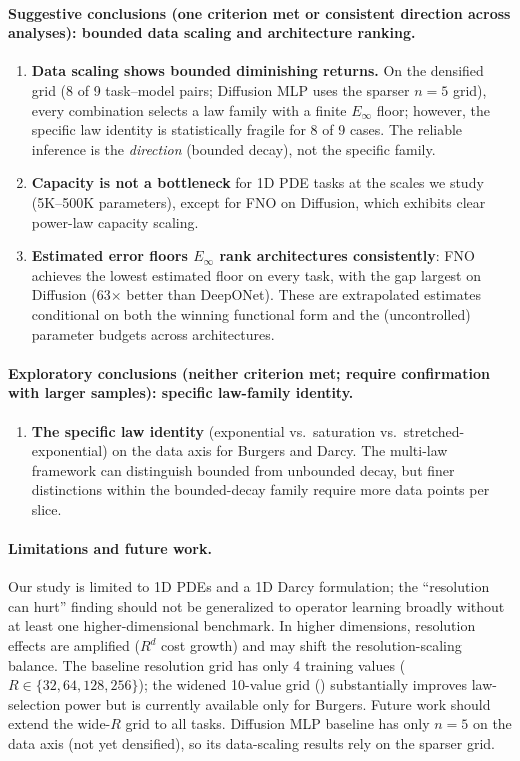 \documentclass[11pt]{article}
\newcommand{\Einf}{E_\infty}
\begin{document}
\paragraph{Suggestive conclusions (one criterion met or consistent
direction across analyses): bounded data scaling and architecture
ranking.}
\begin{enumerate}[resume]
  \item \textbf{Data scaling shows bounded diminishing returns.}
    On the densified grid (8 of 9 task--model pairs; Diffusion MLP
    uses the sparser $n=5$ grid), every combination selects a
    law family with a finite $\Einf$ floor; however, the specific
    law identity is statistically fragile for 8 of 9 cases.
    The reliable inference is the \emph{direction} (bounded decay),
    not the specific family.
  \item \textbf{Capacity is not a bottleneck} for 1D PDE tasks at
    the scales we study (5K--500K parameters), except for FNO on
    Diffusion, which exhibits clear power-law capacity scaling.
  \item \textbf{Estimated error floors $\Einf$ rank architectures
    consistently}: FNO achieves the lowest estimated floor on every
    task, with the gap largest on Diffusion (63$\times$ better than
    DeepONet). These are extrapolated estimates conditional on
    both the winning functional form and the (uncontrolled)
    parameter budgets across architectures.
\end{enumerate}

\paragraph{Exploratory conclusions (neither criterion met; require
confirmation with larger samples): specific law-family identity.}
\begin{enumerate}[resume]
  \item \textbf{The specific law identity} (exponential vs.\
    saturation vs.\ stretched-exponential) on the data axis for
    Burgers and Darcy. The multi-law framework can distinguish
    bounded from unbounded decay, but finer distinctions within the
    bounded-decay family require more data points per slice.
\end{enumerate}

\paragraph{Limitations and future work.}
Our study is limited to 1D PDEs and a 1D Darcy formulation; the
``resolution can hurt'' finding should not be generalized to operator
learning broadly without at least one higher-dimensional benchmark.
In higher dimensions, resolution effects are amplified ($R^d$ cost
growth) and may shift the resolution-scaling balance. The baseline resolution grid
has only 4 training values ($R \in \{32, 64, 128, 256\}$); the
widened 10-value grid () substantially improves
law-selection power but is currently available only for Burgers.
Future work should extend the wide-$R$ grid to all tasks.
Diffusion MLP baseline has only $n=5$ on the data axis (not yet
densified), so its data-scaling results rely on the sparser grid.
\end{document}
